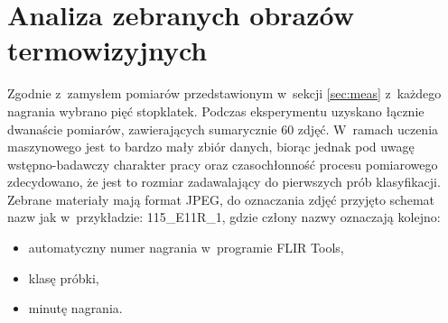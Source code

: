 
\section{Analiza zebranych obrazów termowizyjnych}
Zgodnie z~zamysłem pomiarów przedstawionym w~sekcji \ref{sec:meas} z~każdego
nagrania wybrano pięć stopklatek.
Podczas eksperymentu uzyskano łącznie dwanaście pomiarów, zawierających
sumarycznie 60 zdjęć.
W~ramach uczenia maszynowego jest to bardzo mały zbiór danych, biorąc jednak
pod uwagę wstępno-badawczy charakter pracy oraz czasochłonność procesu 
pomiarowego zdecydowano, że jest to rozmiar zadawalający do pierwszych
prób klasyfikacji.
Zebrane materiały mają format JPEG, do oznaczania zdjęć przyjęto schemat
nazw jak w~przykładzie: 115\_E11R\_1, gdzie człony nazwy oznaczają kolejno:
\begin{itemize}
	\item automatyczny numer nagrania w~programie FLIR Tools,
	\item klasę próbki,
	\item minutę nagrania.
\end{itemize}

